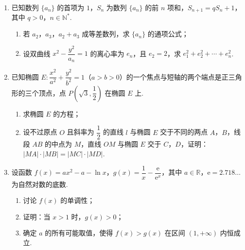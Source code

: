 \begin{description}
\begin{enumerate}[leftmargin=5pt]
\begin{enumerate}
\item 证明：\(\sin A\sin B=\sin C\)；
\item 若 \(b^2+c^2-a^2=\dfrac65bc\)，求 \(\tan B\).
\end{enumerate}

        \item 已知数列 \(\{a_n\}\) 的首项为 \(1\)，\(S_n\) 为数列 \(\{a_n\}\) 的前 \(n\) 项和，\(S_{n+1}=qS_n+1\)，其中 \(q>0\)，\(n\in\mathbb{N}^*\).

\begin{enumerate}
\item 若 \(a_2\)，\(a_3\)，\(a_2+a_3\) 成等差数列，求 \(\{a_n\}\) 的通项公式；
\item 设双曲线 \(x^2-\dfrac{y^2}{a_n}=1\) 的离心率为 \(e_n\)，且 \(e_2=2\)，求 \(e_1^2+e_2^2+\cdots+e_n^2\).
\end{enumerate}

        \item 已知椭圆 \(E:\dfrac{x^2}{a^2}+\dfrac{y^2}{b^2}=1\)（\(a>b>0\)）的一个焦点与短轴的两个端点是正三角形的三个顶点，点 \(P\!\left(\sqrt3,\dfrac12\right)\) 在椭圆 \(E\) 上.

\begin{enumerate}
\item 求椭圆 \(E\) 的方程；
\item 设不过原点 \(O\) 且斜率为 \(\dfrac12\) 的直线 \(l\) 与椭圆 \(E\) 交于不同的两点 \(A\)，\(B\)，线段 \(AB\) 的中点为 \(M\)，直线 \(OM\) 与椭圆 \(E\) 交于 \(C\)，\(D\)，证明：\(|MA|\cdot|MB|=|MC|\cdot|MD|\).
\end{enumerate}

        \item 设函数 \(f(x)=ax^2-a-\ln x\)，\(g(x)=\dfrac1x-\dfrac{{\mathrm{e}}}{{\mathrm{e}}^x}\)，其中 \(a\in\mathbb{R}\)，\({\mathrm{e}}=2.718\ldots\) 为自然对数的底数.

\begin{enumerate}
\item 讨论 \(f(x)\) 的单调性；
\item 证明：当 \(x>1\) 时，\(g(x)>0\)；
\item 确定 \(a\) 的所有可能取值，使得 \(f(x)>g(x)\) 在区间 \((1,+\infty)\) 内恒成立.
\end{enumerate}

    \end{enumerate}

\end{description}


